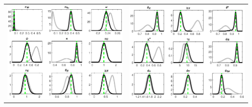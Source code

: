 \documentclass[a4paper,11pt]{article}
\numberwithin{equation}{section}
\begin{document}
\begin{minipage}{\linewidth}
{\begin{tabular}{p{10cm} p{10cm}}
	\includegraphics[width=10cm, trim =0 0 0.97cm 0]{SAFiscal_PriorsAndPosteriors3.eps} & \includegraphics[width=10cm, trim =0.97cm 0 0 0]{SAFiscal_PriorsAndPosteriors4.eps}\\

\end{tabular}}
\end{minipage}
\end{document}
